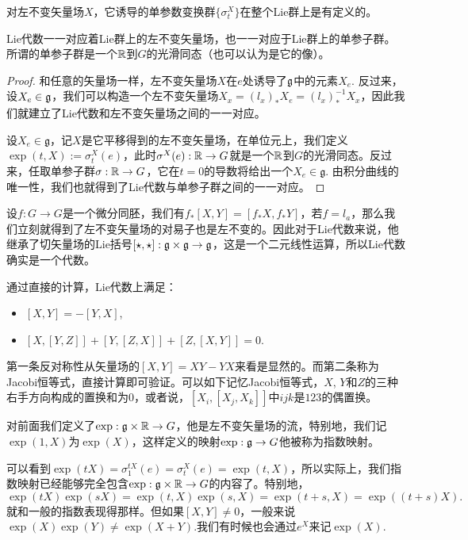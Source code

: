 对左不变矢量场$X$，它诱导的单参数变换群$\{\sigma^X_t\}$在整个Lie群上是有定义的。

\begin{pro}
Lie代数一一对应着Lie群上的左不变矢量场，也一一对应于Lie群上的单参子群。所谓的单参子群是一个$\mathbb{R}$到$G$的光滑同态（也可以认为是它的像）。
\end{pro}

\begin{proof}
和任意的矢量场一样，左不变矢量场$X$在$e$处诱导了${\mathfrak{g}}$中的元素$X_e$. 反过来，设$X_e\in{\mathfrak{g}}$，我们可以构造一个左不变矢量场$X_x=(l_{x})_*X_e=(l_x)^{-1}_*X_x$，因此我们就建立了Lie代数和左不变矢量场之间的一一对应。

设$X_e\in\mathfrak{g}$，记$X$是它平移得到的左不变矢量场，在单位元上，我们定义$\exp(t,X):=\sigma^X_t(e)$，此时$\sigma^X(e):\mathbb{R}\to G$就是一个$\mathbb{R}$到$G$的光滑同态。反过来，任取单参子群$\sigma:\mathbb{R} \to G$，它在$t=0$的导数将给出一个$X_e\in \mathfrak{g}$. 由积分曲线的唯一性，我们也就得到了Lie代数与单参子群之间的一一对应。
\end{proof}

\begin{pro}
设$f:G\to G$是一个微分同胚，我们有$f_*[X,Y]=[f_*X,f_*Y]$，若$f=l_a$，那么我们立刻就得到了左不变矢量场的对易子也是左不变的。因此对于Lie代数来说，他继承了切矢量场的Lie括号$[\star,\star]:{\mathfrak{g}}\times {\mathfrak{g}}\to {\mathfrak{g}}$，这是一个二元线性运算，所以Lie代数确实是一个代数。
\end{pro}

通过直接的计算，Lie代数上满足：
\begin{itemize}
\item $[X,Y]=-[Y,X]$,
\item $[X,[Y,Z]]+[Y,[Z,X]]+[Z,[X,Y]]=0$.
\end{itemize}
第一条反对称性从矢量场的$[X,Y]=XY-YX$来看是显然的。而第二条称为Jacobi恒等式，直接计算即可验证。可以如下记忆Jacobi恒等式，$X$, $Y$和$Z$的三种右手方向构成的置换和为$0$，或者说，$[X_i,[X_j,X_k]]$中$ijk$是$123$的偶置换。

\begin{para}[指数映射]
对前面我们定义了$\exp:{\mathfrak{g}}\times \mathbb{R}\to G$，他是左不变矢量场的流，特别地，我们记$\exp(1,X)$为$\exp(X)$，这样定义的映射$\exp:{\mathfrak{g}}\to G$他被称为指数映射。
\end{para}

可以看到$\exp(tX)=\sigma^{tX}_1(e)=\sigma^{X}_t(e)=\exp(t,X)$，所以实际上，我们指数映射已经能够完全包含$\exp:{\mathfrak{g}}\times \mathbb{R}\to G$的内容了。特别地，
\[
	\exp(tX)\exp(sX)=\exp(t,X)\exp(s,X)=\exp(t+s,X)=\exp((t+s)X).
\]
就和一般的指数表现得那样。但如果$[X,Y]\neq 0$，一般来说$\exp(X)\exp(Y)\neq \exp(X+Y)$.我们有时候也会通过$e^{X}$来记$\exp(X)$.

